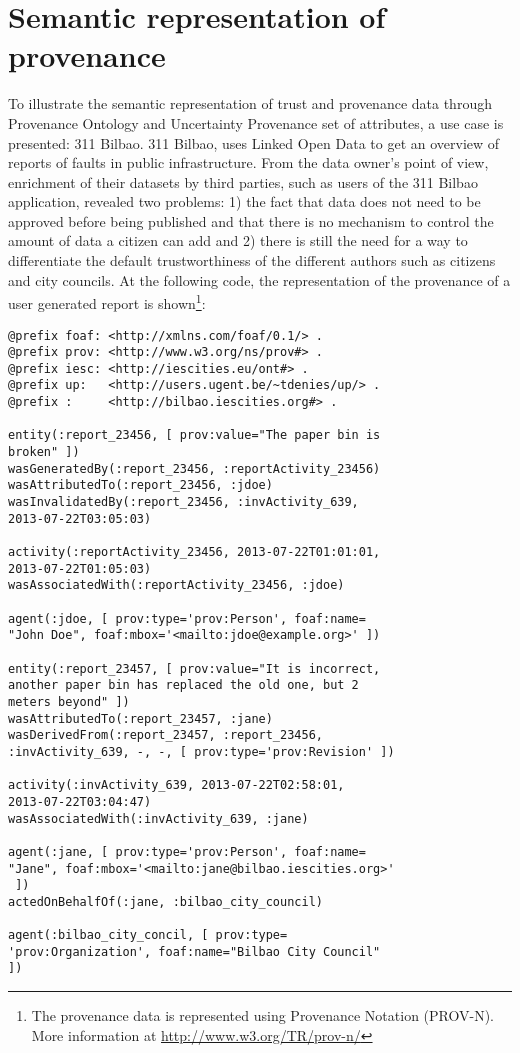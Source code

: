 \section{Semantic representation of provenance}
\label{sec:use_cases}

To illustrate the semantic representation of trust and provenance data through Provenance Ontology and Uncertainty Provenance set of attributes, a use case is presented: 311 Bilbao. 311 Bilbao, uses Linked Open Data to get an overview of reports of faults in public infrastructure. From the data owner’s point of view, enrichment of their datasets by third parties, such as users of the 311 Bilbao application, revealed two problems: 1) the fact that data does not need to be approved before being published and that there is no mechanism to control the amount of data a citizen can add and 2) there is still the need for a way to differentiate the default trustworthiness of the different authors such as citizens and city councils. At the following code, the representation of the provenance of a user generated report is shown\footnote{The provenance data is represented using Provenance Notation (PROV-N). More information at \url{http://www.w3.org/TR/prov-n/}}:

\lstset{numbers=left, basicstyle=\ttfamily\scriptsize,}
\begin{lstlisting}
@prefix foaf: <http://xmlns.com/foaf/0.1/> .
@prefix prov: <http://www.w3.org/ns/prov#> .
@prefix iesc: <http://iescities.eu/ont#> .
@prefix up:   <http://users.ugent.be/~tdenies/up/> .
@prefix :     <http://bilbao.iescities.org#> .

entity(:report_23456, [ prov:value="The paper bin is
broken" ])
wasGeneratedBy(:report_23456, :reportActivity_23456)
wasAttributedTo(:report_23456, :jdoe)
wasInvalidatedBy(:report_23456, :invActivity_639,
2013-07-22T03:05:03)

activity(:reportActivity_23456, 2013-07-22T01:01:01,
2013-07-22T01:05:03)
wasAssociatedWith(:reportActivity_23456, :jdoe)

agent(:jdoe, [ prov:type='prov:Person', foaf:name=
"John Doe", foaf:mbox='<mailto:jdoe@example.org>' ])

entity(:report_23457, [ prov:value="It is incorrect,
another paper bin has replaced the old one, but 2
meters beyond" ])
wasAttributedTo(:report_23457, :jane)
wasDerivedFrom(:report_23457, :report_23456,
:invActivity_639, -, -, [ prov:type='prov:Revision' ])

activity(:invActivity_639, 2013-07-22T02:58:01,
2013-07-22T03:04:47)
wasAssociatedWith(:invActivity_639, :jane)

agent(:jane, [ prov:type='prov:Person', foaf:name=
"Jane", foaf:mbox='<mailto:jane@bilbao.iescities.org>'
 ])
actedOnBehalfOf(:jane, :bilbao_city_council)

agent(:bilbao_city_concil, [ prov:type=
'prov:Organization', foaf:name="Bilbao City Council"
])

\end{lstlisting}

